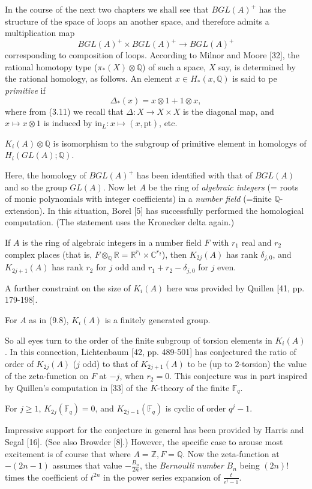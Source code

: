 In the course of the next two chapters we shall see that $BGL(A)^+$ has the structure of the space of loops an another space, and therefore admits a multiplication map
\[BGL(A)^+ \times BGL(A)^+ \longrightarrow BGL(A)^+ \]
corresponding to composition of loops. According to Milnor and Moore [32], the rational homotopy type ($\pi_*(X)\otimes \mathbb{Q}$) of such a space, $X$ say, is determined by the rational homology, as follows. An element $x\in H_*(x,\mathbb{Q})$ is said to pe {\em primitive} if
\[\Delta_*(x)=x\otimes 1+1\otimes x,\]
where from (3.11) we recall that $\Delta\colon   X \longrightarrow X\times X$ is the diagonal map, and $x\mapsto x\otimes 1$ is induced by $\textrm{in}_L\colon   x\mapsto (x,\textrm{pt})$, etc.\ 
\begin{theorem}
  $K_i(A)\otimes \mathbb{Q}$ is isomorphism to the subgroup of primitive element in homologys of $H_i(GL(A);\mathbb{Q})$.
\end{theorem}
Here, the homology of $BGL(A)^+$ has been identified with that of $BGL(A)$ and so the group $GL(A)$. Now let $A$ be the ring of {\em algebraic integers}\index{algebraic integers} (= roots of monic polynomials with integer coefficients) in a {\em number field}\index{number field} (=finite $\mathbb{Q}$-extension). In this situation, Borel [5] has successfully performed the homological computation. (The statement uses the Kronecker delta again.)
\begin{theorem}
  If $A$ is the ring of algebraic integers in a number field $F$ with $r_1$ real and $r_2$ complex places (that is, $F\otimes_{\mathbb{Q}}\mathbb{R}=\mathbb{R}^{r_1}\times \mathbb{C}^{r_2}$), then $K_{2j}(A)$ has rank $\delta_{j,0}$, and $K_{2j+1}(A)$ has rank $r_2$ for $j$ odd and $r_1+r_2-\delta_{j,0}$ for $j$ even.
\end{theorem}
A further constraint on the size of $K_i(A)$ here was provided by Quillen [41, pp. 179-198].
\begin{theorem}
  For $A$ as in (9.8), $K_i(A)$ is a finitely generated group.
\end{theorem}
So all eyes turn to the order of the finite subgroup of torsion elements in $K_i(A)$. In this connection, Lichtenbaum [42, pp. 489-501] has conjectured the ratio of order of $K_{2j}(A)$ ($j$ odd) to that of $K_{2j+1}(A)$ to be (up to $2$-torsion) the value of the zeta-function on $F$ at $-j$, when $r_2 =0$. This conjecture was in part inspired by Quillen's computation in [33] of the $K$-theory of the finite $\mathbb{F}_q$.
\begin{theorem}
  For $j\geqslant 1$, $K_{2j}(\mathbb{F}_q)=0$, and $K_{2j-1}(\mathbb{F}_q)$ is cyclic of order $q^j -1$.
\end{theorem}
Impressive support for the conjecture in general has been provided by Harris and Segal [16]. (See also Browder [8].) However, the specific case to arouse most excitement is of course that where $A=\mathbb{Z}, F=\mathbb{Q}$. Now the zeta-function at $-(2n-1)$ assumes that value $-\frac{B_n}{2n}$, the {\em Bernoulli number} $B_n$ being $(2n)!$ times the coefficient of $t^{2n}$ in the power series expansion of $\frac{t}{e^t-1}$.

